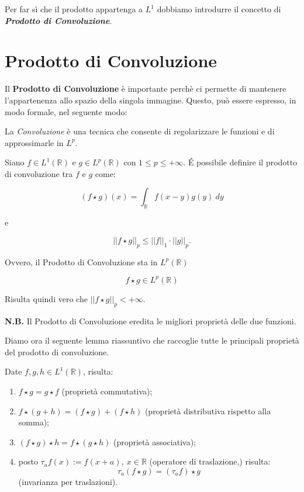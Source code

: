 \vspace{1cm}

Per far sì che il prodotto appartenga a $L^1$ dobbiamo introdurre il concetto di
\textit{\textbf{Prodotto di Convoluzione}}.

\section{Prodotto di Convoluzione}
Il \textbf{Prodotto di Convoluzione} è importante perchè ci permette di mantenere
l'appartenenza allo spazio della singola immagine. Questo, può essere espresso,
in modo formale, nel seguente modo:
\begin{center}
    La \textit{Convoluzione} è una tecnica che consente di regolarizzare le funzioni
    e di approssimarle in $L^p$.
\end{center}

\begin{definition}
    Siano $f \in L^1(\mathbb{R})$ e $g \in L^p(\mathbb{R})$ con $1 \leq p \leq
        +\infty$. \'E possibile definire il prodotto di convoluzione tra $f$ e $g$
    come:

    $$
        \left( f \star g\right)(x) = \int_{\mathbb{R}} f(x - y) g(y) \ dy
    $$

    e

    $$
        ||f \star g||_p \leq ||f||_1 \cdot ||g||_p.
    $$

    Ovvero, il Prodotto di Convoluzione sta in $L^p (\mathbb{R})$

    $$f
        \star g \in L^p(\mathbb{R})
    $$

    Risulta quindi vero che $||f \star g||_p < +\infty$.

\end{definition}

\vspace{0.3cm}

\textbf{N.B.} Il Prodotto di Convoluzione eredita le migliori proprietà delle due
funzioni.

\vspace{1cm}

Diamo ora il seguente lemma riassuntivo che raccoglie tutte le principali
proprietà del prodotto di convoluzione.

\begin{lemma}
    Date $f, g, h \in L^1(\mathbb{R})$, risulta:

    \begin{enumerate}
        \item $f \star g = g \star f$ (proprietà commutativa);
        \item $f \star (g + h) = (f \star g) + (f \star h)$ (proprietà
              distributiva rispetto alla somma);
        \item $(f \star g) \star h = f \star (g \star h)$ (proprietà
              associativa);
        \item posto $\tau_a f(x) := f(x + a), \ x \in \mathbb{R}$ (operatore di
              traslazione,) risulta:
              $$
                  \tau_a (f \star g) = (\tau_a f) \star g
              $$
              (invarianza per traslazioni).
    \end{enumerate}
\end{lemma}

